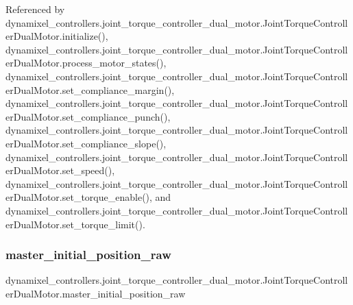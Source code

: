 Referenced by dynamixel\+\_\+controllers.\+joint\+\_\+torque\+\_\+controller\+\_\+dual\+\_\+motor.\+Joint\+Torque\+Controller\+Dual\+Motor.\+initialize(), dynamixel\+\_\+controllers.\+joint\+\_\+torque\+\_\+controller\+\_\+dual\+\_\+motor.\+Joint\+Torque\+Controller\+Dual\+Motor.\+process\+\_\+motor\+\_\+states(), dynamixel\+\_\+controllers.\+joint\+\_\+torque\+\_\+controller\+\_\+dual\+\_\+motor.\+Joint\+Torque\+Controller\+Dual\+Motor.\+set\+\_\+compliance\+\_\+margin(), dynamixel\+\_\+controllers.\+joint\+\_\+torque\+\_\+controller\+\_\+dual\+\_\+motor.\+Joint\+Torque\+Controller\+Dual\+Motor.\+set\+\_\+compliance\+\_\+punch(), dynamixel\+\_\+controllers.\+joint\+\_\+torque\+\_\+controller\+\_\+dual\+\_\+motor.\+Joint\+Torque\+Controller\+Dual\+Motor.\+set\+\_\+compliance\+\_\+slope(), dynamixel\+\_\+controllers.\+joint\+\_\+torque\+\_\+controller\+\_\+dual\+\_\+motor.\+Joint\+Torque\+Controller\+Dual\+Motor.\+set\+\_\+speed(), dynamixel\+\_\+controllers.\+joint\+\_\+torque\+\_\+controller\+\_\+dual\+\_\+motor.\+Joint\+Torque\+Controller\+Dual\+Motor.\+set\+\_\+torque\+\_\+enable(), and dynamixel\+\_\+controllers.\+joint\+\_\+torque\+\_\+controller\+\_\+dual\+\_\+motor.\+Joint\+Torque\+Controller\+Dual\+Motor.\+set\+\_\+torque\+\_\+limit().

\mbox{\label{classdynamixel__controllers_1_1joint__torque__controller__dual__motor_1_1_joint_torque_controller_dual_motor_a39b1f466ccb7d11f1c37f0fcec4ab974}} 
\subsubsection{\texorpdfstring{master\+\_\+initial\+\_\+position\+\_\+raw}{master\_initial\_position\_raw}}
{\footnotesize\ttfamily dynamixel\+\_\+controllers.\+joint\+\_\+torque\+\_\+controller\+\_\+dual\+\_\+motor.\+Joint\+Torque\+Controller\+Dual\+Motor.\+master\+\_\+initial\+\_\+position\+\_\+raw}



